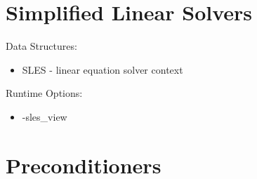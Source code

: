 
{\small
\noindent

}

\section{Simplified Linear Solvers}

\noindent
Data Structures:
\begin{itemize}
\item SLES - linear equation solver context
\end{itemize}
Runtime Options:
\begin{itemize}
\item -sles\_view
\end{itemize}


{\small
\noindent

}

\section{Preconditioners}

